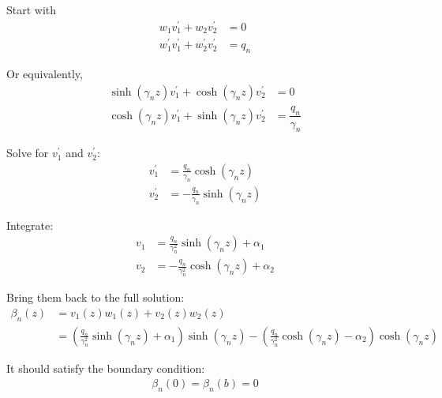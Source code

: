 \begin{solution} 

Start with 
    \begin{align*}
      w_{1}v_{1}^{\prime} + w_{2}v_{2}^{\prime} &= 0 \\
      w_{1}^{\prime}v_{1}^{\prime} + w_{2}^{\prime}v_{2}^{\prime} &= q_{n}
    \end{align*}

Or equivalently,
    \begin{align*}
      \sinh({\gamma_{n}z}) v_{1}^{\prime} + \cosh({\gamma_{n}z}) v_{2}^{\prime} &= 0 \\
      \cosh({\gamma_{n}z}) v_{1}^{\prime} + \sinh({\gamma_{n}z}) v_{2}^{\prime} &= \dfrac{q_{n}}{\gamma_{n}}    
    \end{align*}

Solve for $v_{1}^{\prime}$ and $v_{2}^{\prime}$:
    \begin{align*}
       v_{1}^{\prime} &= \frac{q_{n}}{\gamma_{n}}\cosh\left(\gamma_{n}z\right)  \\
       v_{2}^{\prime} &= -\frac{q_{n}}{\gamma_{n}}\sinh\left(\gamma_{n}z\right)
    \end{align*}

Integrate:
    \begin{align*}
      v_{1} &= \frac{q_{n}}{\gamma_{n}^{2}}\sinh\left(\gamma_{n}z\right) + \alpha_{1} \\
      v_{2} &= -\frac{q_{n}}{\gamma_{n}^{2}}\cosh\left(\gamma_{n}z\right) + \alpha_{2} 
    \end{align*}

Bring them back to the full solution:
    \begin{align*}
    	\beta_{n}\left(z\right) &= v_{1}\left(z\right)w_{1}\left(z\right) + v_{2}\left(z\right)w_{2}\left(z\right) \\
	&= ( \frac{q_{n}}{\gamma_{n}^{2}}\sinh\left(\gamma_{n}z\right) + \alpha_{1})\sinh({\gamma_{n}z}) 
	- (\frac{q_{n}}{\gamma_{n}^{2}}\cosh\left(\gamma_{n}z\right) - \alpha_{2})\cosh({\gamma_{n}z})
    \end{align*}

It should satisfy the boundary condition:
    \begin{align*}
      \beta_{n}(0) = \beta_{n}(b) = 0
    \end{align*}

\end{solution} 


